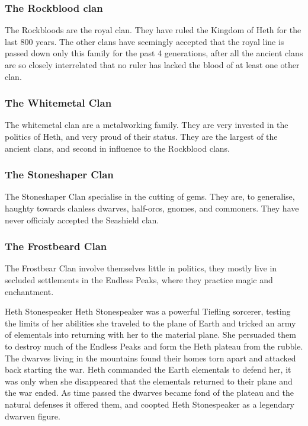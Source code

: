 \documentclass[10pt,twoside,twocolumn,openany,justified,bg=full,nomultitoc]{dndbook}
\begin{document}
\subsubsection{The Rockblood clan}
\label{sec-2-2-1-1}

The Rockbloods are the royal clan. They have ruled the Kingdom of Heth for the last 800 years. The other clans have seemingly accepted that the royal line is passed down only this family for the past 4 generations, after all the ancient clans are so closely interrelated that no ruler has lacked the blood of at least one other clan.
\subsubsection{The Whitemetal Clan}
\label{sec-2-2-1-2}
The whitemetal clan are a metalworking family. They are very invested in the politics of Heth, and very proud of their status. They are the largest of the ancient clans, and second in influence to the Rockblood clans.

\subsubsection{The Stoneshaper Clan}
\label{sec-2-2-1-3}
The Stoneshaper Clan specialise in the cutting of gems. They are, to generalise, haughty towards clanless dwarves, half-orcs, gnomes, and commoners. They have never officialy accepted the Seashield clan.

\subsubsection{The Frostbeard Clan}
\label{sec-2-2-1-4}
The Frostbear Clan involve themselves little in politics, they mostly live in secluded settlements in the Endless Peaks, where they practice magic and enchantment.

\begin{paperbox}[float=!t]{Heth Stonespeaker}\label{Heth-Stonespeaker}
Heth Stonespeaker was a powerful Tiefling sorcerer, testing the limits of her abilities she traveled to the plane of Earth and tricked an army of elementals into returning with her to the material plane. She persuaded them to destroy much of the Endless Peaks and form the Heth plateau from the rubble. The dwarves living in the mountains found their homes torn apart and attacked back starting the war. Heth commanded the Earth elementals to defend her, it was only when she disappeared that the elementals returned to their plane and the war ended. As time passed the dwarves became fond of the plateau and the natural defenses it offered them, and coopted Heth Stonespeaker as a legendary dwarven figure.
\end{paperbox}
\end{document}
